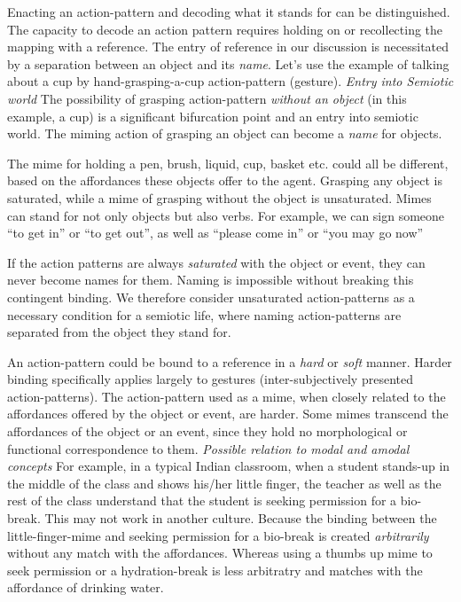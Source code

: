 Enacting an action-pattern and decoding what it stands for can be distinguished. 
The capacity to decode an action pattern requires holding on or recollecting the mapping with a reference. 
The entry of reference in our discussion is necessitated by a separation between an object and its \textit{name}.
Let's use the example of talking about a cup by hand-grasping-a-cup action-pattern (gesture). 
\emph{Entry into Semiotic world} The possibility of grasping action-pattern \textit{without an object} (in this example, a cup) is a significant bifurcation point and an entry into semiotic world. 
The miming action of grasping an object can become a \textit{name} for objects. 

The mime for holding a pen, brush, liquid, cup, basket etc. could all be different, based on the affordances these objects offer to the agent. Grasping any object is saturated, while a mime of grasping without the object is unsaturated. 
Mimes can stand for not only objects but also verbs. For example, we can sign someone ``to get in'' or ``to get out'', as well as ``please come in'' or ``you may go now''

If the action patterns are always \textit{saturated} with the object or event, they can never become names for them. Naming is impossible without breaking this contingent binding. We therefore consider unsaturated action-patterns as a necessary condition for a semiotic life, where naming action-patterns are separated from the object they stand for. 

An action-pattern could be bound to a reference in a \textit{hard} or \textit{soft} manner. Harder binding specifically applies largely to gestures (inter-subjectively presented action-patterns). 
The action-pattern used as a mime, when closely related to the affordances offered by the object or event, are harder. 
Some mimes transcend the affordances of the object or an event, since they hold no morphological or functional correspondence to them. \emph{Possible relation to modal and amodal concepts} For example, in a typical Indian classroom, when a student stands-up in the middle of the class and shows his/her little finger, the teacher as well as the rest of the class understand that the student is seeking permission for a bio-break. This may not work in another culture. Because the binding between the little-finger-mime and seeking permission for a bio-break is created \textit{arbitrarily} without any match with the affordances. Whereas using a thumbs up mime to seek permission or a hydration-break is less arbitratry and matches with the affordance of drinking water. 

